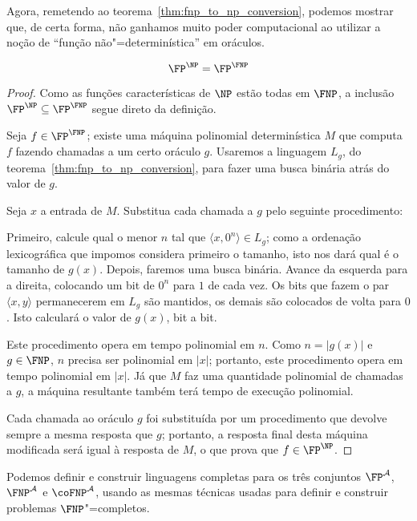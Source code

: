 Agora,
remetendo ao teorema~\ref{thm:fnp_to_np_conversion},
podemos mostrar que,
de certa forma,
não ganhamos muito poder computacional
ao utilizar a noção de ``função não"=determinística'' em oráculos.

\begin{theorem}
    \begin{equation*}
        \FP^\NP = \FP^\FNP
    \end{equation*}
\end{theorem}

\begin{proof}
    Como as funções características de $\NP$ estão todas em $\FNP$,
    a inclusão $\FP^\NP \subseteq \FP^\FNP$ segue direto da definição.

    Seja $f \in \FP^\FNP$;
    existe uma máquina polinomial determinística $M$
    que computa $f$ fazendo chamadas a um certo oráculo $g$.
    Usaremos a linguagem $L_g$,
    do teorema~\ref{thm:fnp_to_np_conversion},
    para fazer uma busca binária atrás do valor de $g$.

    Seja $x$ a entrada de $M$.
    Substitua cada chamada a $g$
    pelo seguinte procedimento:

    Primeiro, calcule qual o menor $n$
    tal que $\langle x, 0^n \rangle \in L_g$;
    como a ordenação lexicográfica que impomos
    considera primeiro o tamanho,
    isto nos dará qual é o tamanho de $g(x)$.
    Depois,
    faremos uma busca binária.
    Avance da esquerda para a direita,
    colocando um bit de $0^n$ para $1$ de cada vez.
    Os bits que fazem o par $\langle x, y \rangle$
    permanecerem em $L_g$ são mantidos,
    os demais são colocados de volta para $0$.
    Isto calculará o valor de $g(x)$,
    bit a bit.

    Este procedimento opera em tempo polinomial em $n$.
    Como $n = |g(x)|$ e $g \in \FNP$,
    $n$ precisa ser polinomial em $|x|$;
    portanto, este procedimento opera em tempo polinomial em $|x|$.
    Já que $M$ faz uma quantidade polinomial de chamadas a $g$,
    a máquina resultante também terá tempo de execução polinomial.

    Cada chamada ao oráculo $g$ foi substituída por
    um procedimento que devolve sempre a mesma resposta que $g$;
    portanto, a resposta final desta máquina modificada
    será igual à resposta de $M$,
    o que prova que $f \in \FP^\NP$.
\end{proof}

Podemos definir e construir linguagens completas para os três conjuntos
$\FP^\mathcal A$, $\FNP^\mathcal A$ e $\coFNP^\mathcal A$,
usando as mesmas técnicas usadas para definir e construir problemas $\FNP$"=completos.

